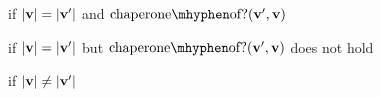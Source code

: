 \documentclass{sigplanconf}
\begin{document}
\red{\sval{\chacrk{\vv}::\ks}{\sigma}{\vvp}}{\sval{\ks}{\sigma}{\vvp}}
if $|\mathbf{v}|=|\mathbf{v'}|$ and $\mathrm{chaperone\mhyphen of?}(\vvp,\vv)$

if $|\mathbf{v}|=|\mathbf{v'}|$ but $\mathrm{chaperone\mhyphen of?}(\vvp,\vv)$ does not hold

if $|\mathbf{v}|\ne|\mathbf{v'}|$











\end{document}
